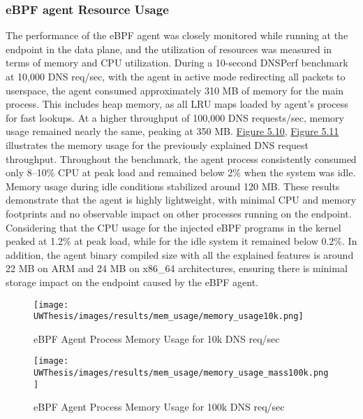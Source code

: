 \documentclass [11pt, proquest] {uwthesis}[2020/02/24]
\begin{document}
\subsubsection{eBPF agent Resource Usage}
The performance of the eBPF agent was closely monitored while running at the endpoint in the data plane, and the utilization of resources was measured in terms of memory and CPU utilization. During a 10-second DNSPerf benchmark at 10,000 DNS req/sec, with the agent in active mode redirecting all packets to userspace, the agent consumed approximately 310 MB of memory for the main process. This includes heap memory, as all LRU maps loaded by agent's process for fast lookups. At a higher throughput of 100,000 DNS requests/sec, memory usage remained nearly the same, peaking at 350 MB. \hyperref[fig:mem10k]{Figure 5.10},  \hyperref[fig:mem100k]{Figure 5.11} illustrates the memory usage for the previously explained DNS request throughput. Throughout the benchmark, the agent process consistently consumed only 8–10\% CPU at peak load and remained below 2\% when the system was idle. Memory usage during idle conditions stabilized around 120 MB. These results demonstrate that the agent is highly lightweight, with minimal CPU and memory footprints and no observable impact on other processes running on the endpoint. Considering that the CPU usage for the injected eBPF programs in the kernel peaked at 1.2\% at peak load, while for the idle system it remained below 0.2\%. In addition, the agent binary compiled size with all the explained features is around 22 MB on ARM and 24 MB on x86\_64 architectures, ensuring there is minimal storage impact on the endpoint caused by the eBPF agent.

\begin{figure}[H]
  \centering
  \begin{minipage}[b]{0.48\textwidth}
    \centering
    \texttt{[image: UWThesis/images/results/mem\_usage/memory\_usage10k.png]}
    \caption{eBPF Agent Process Memory Usage for 10k DNS req/sec}
    \label{fig:mem10k}
  \end{minipage}
  \hfill
  \begin{minipage}[b]{0.48\textwidth}
    \centering
    \texttt{[image: UWThesis/images/results/mem\_usage/memory\_usage\_mass100k.png]}
    \caption{eBPF Agent Process Memory Usage for 100k DNS req/sec}
    \label{fig:mem100k}
  \end{minipage}
\end{figure}
\end{document}
